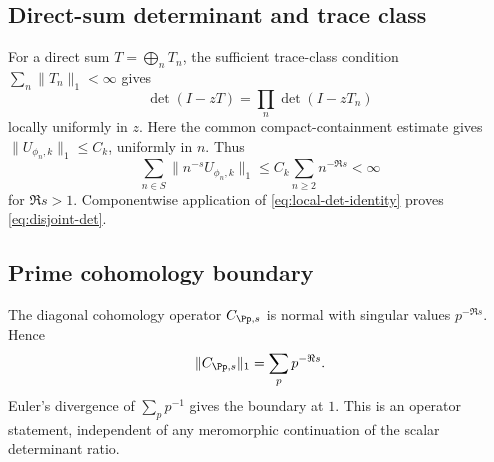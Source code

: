 \subsection{Direct-sum determinant and trace class}

For a direct sum \(T=\bigoplus_nT_n\), the sufficient trace-class condition
\(\sum_n\lVert T_n\rVert_1<\infty\) gives
\[
        \det(I-zT)=\prod_n\det(I-zT_n)
\]
locally uniformly in \(z\).  Here the common compact-containment estimate
gives \(\lVert U_{\phi_n,k}\rVert_1\le C_k\), uniformly in \(n\).  Thus
\[
 \sum_{n\in S}\lVert n^{-s}U_{\phi_n,k}\rVert_1
 \le C_k\sum_{n\ge2}n^{-\Re s}<\infty
\]
for \(\Re s>1\).  Componentwise application of
\eqref{eq:local-det-identity} proves \eqref{eq:disjoint-det}.

\subsection{Prime cohomology boundary}

The diagonal cohomology operator \(C_{\Pp,s}\) is normal with singular
values \(p^{-\Re s}\).  Hence
\[
        \lVert C_{\Pp,s}\rVert_1=\sum_pp^{-\Re s}.
\]
Euler's divergence of \(\sum_pp^{-1}\) gives the boundary at \(1\).
This is an operator statement, independent of any meromorphic continuation
of the scalar determinant ratio.
